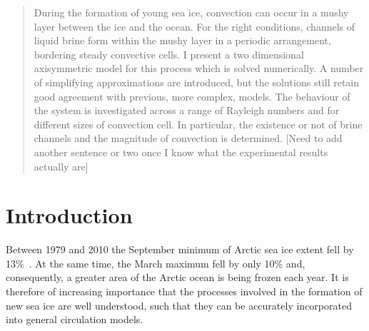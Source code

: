 \documentclass[11pt]{proc}
\begin{document}


\setlength{\baselineskip}{13pt}

\onecolumn

\setcounter{page}{1}
\begin{abstract}
During the formation of young sea ice, convection can occur in a mushy layer between the ice and the ocean. For the right conditions, channels of liquid brine form within the mushy layer in a periodic arrangement, bordering steady convective cells. I present a two dimensional axisymmetric model for this process which is solved numerically. A number of simplifying approximations are introduced, but the solutions still retain good agreement with previous, more complex, models. The behaviour of the system is investigated across a range of Rayleigh numbers and for different sizes of convection cell. In particular, the existence or not of brine channels and the magnitude of convection is determined.
[Need to add another sentence or two once I know what the experimental results actually are]
\end{abstract}

\section{Introduction}
\label{sec:intro}

Between 1979 and 2010 the September minimum of Arctic sea ice extent fell by 13\%~\citep*{cavalieri-parkinson-12}. At the same time, the March maximum fell by only 10\% and, consequently, a greater area of the Arctic ocean is being frozen each year. It is therefore of increasing importance that the processes involved in the formation of new sea ice are well understood, such that they can be accurately incorporated into general circulation models. 
\end{document}
